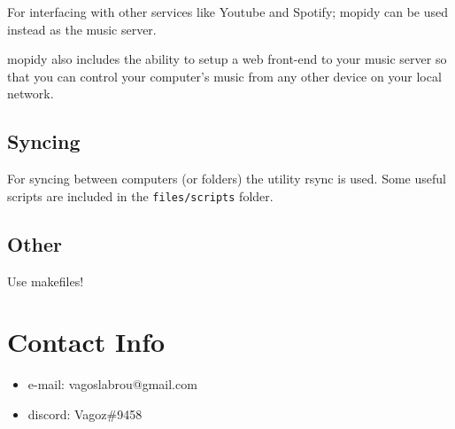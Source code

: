 \documentclass{article}
\let\src\texttt
\begin{document}
For interfacing with other services like Youtube and Spotify;
mopidy can be used instead as the music server.

mopidy also includes the ability to setup a web front-end to your music server 
so that you can control your computer's music from any other device on your local network.

\subsection{Syncing}

For syncing between computers (or folders) the utility rsync is used. 
Some useful scripts are included in the \src{files/scripts} folder.

\subsection{Other}

Use makefiles!

\section{Contact Info}

\begin{itemize}
    \item e-mail: vagoslabrou@gmail.com
    \item discord: Vagoz\#9458
\end{itemize}

\end{document}
